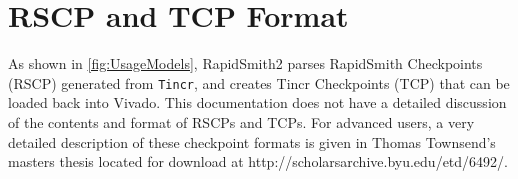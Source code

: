 \newpage
\section{RSCP and TCP Format} \label{sec:rscpTcp}

As shown in \autoref{fig:UsageModels}, RapidSmith2 parses RapidSmith Checkpoints
(RSCP) generated from \texttt{Tincr}, and creates Tincr Checkpoints (TCP) that
can be loaded back into Vivado. This documentation does not have a detailed
discussion of the contents and format of RSCPs and TCPs. For advanced users, a
very detailed description of these checkpoint formats is given in Thomas
Townsend's masters thesis located for download at {\color{blue}
http://scholarsarchive.byu.edu/etd/6492/}.